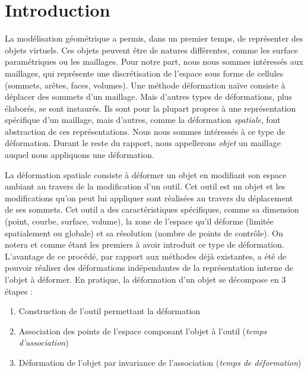 
\chapter{Introduction}

\graphicspath{ {Introduction/IntroductionFigs/PNG/}
  {Introduction/IntroductionFigs/PDF/}
  {Introduction/IntroductionFigs/} }

La modélisation géométrique a permis, dans un premier temps, de représenter
des objets virtuels. Ces objets peuvent être de natures différentes, comme les
surface paramétriques ou les maillages. Pour notre part, nous nous sommes
intéressés aux maillages, qui représente une discrétisation de l'espace sous
forme de cellules (sommets, arêtes, faces, volumes). Une méthode déformation
naïve consiste à déplacer des sommets d'un maillage. Mais d'autres types de
déformations, plus élaborés, se sont instaurés. Ils sont pour la plupart
propres à une représentation spécifique d'un maillage, mais d'autres, comme la
déformation \textit{spatiale}, font abstraction de ces représentations. Nous
nous sommes intéressés à ce type de déformation. Durant le reste du rapport,
nous appellerons \textit{objet} un maillage auquel nous appliquons une
déformation.
	
La déformation spatiale consiste à déformer un objet en modifiant son espace
ambiant au travers de la modification d'un outil. Cet outil est un objet et
les modifications qu'on peut lui appliquer sont réalisées au travers du
déplacement de ses sommets. Cet outil a des caractéristiques spécifiques,
comme sa dimension (point, courbe, surface, volume), la zone de l'espace qu'il
déforme (limitée spatialement ou globale) et sa résolution (nombre de points
de contrôle). On notera \cite{Bar84} et \cite{SP86} comme étant les premiers à
avoir introduit ce type de déformation. L'avantage de ce procédé, par rapport
aux méthodes déjà existantes, a été de pouvoir réaliser des déformations
indépendantes de la représentation interne de l'objet à déformer. \newpage En
pratique, la déformation d'un objet se décompose en 3 étapes :
\begin{enumerate}

\item Construction de l'outil permettant la déformation

\item Association des points de l'espace composant l'objet à l'outil
(\textit{temps d'association})

\item Déformation de l'objet par invariance de l'association (\textit{temps de
déformation})

\end{enumerate} 

